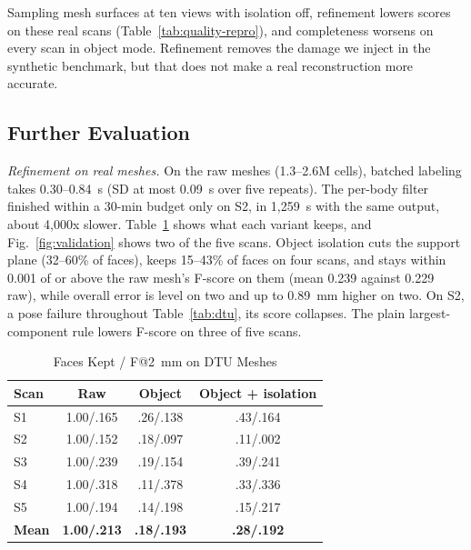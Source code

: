 \documentclass[conference]{IEEEtran}
\begin{document}
Sampling mesh surfaces at ten views with isolation off, refinement lowers scores
on these real scans (Table~\ref{tab:quality-repro}), and completeness worsens on
every scan in object mode. Refinement removes the damage we inject in the synthetic
benchmark, but that does not make a real reconstruction more accurate.

\subsection{Further Evaluation}
\label{sec:further}

\emph{Refinement on real meshes.} On the raw meshes (1.3--2.6M cells), batched
labeling takes 0.30--0.84~s (SD at most 0.09~s over five repeats). The per-body
filter finished within a 30-min budget only on S2, in 1,259~s with the same
output, about 4,000x slower. Table~\ref{tab:isolation} shows what each variant keeps, and
Fig.~\ref{fig:validation} shows two of the five scans. Object isolation
cuts the support plane (32--60\% of faces), keeps 15--43\% of faces on four scans,
and stays within 0.001 of or above the raw mesh's F-score on them (mean 0.239
against 0.229 raw), while overall error is level on two and up to 0.89~mm higher
on two. On S2, a pose failure throughout Table~\ref{tab:dtu}, its score
collapses. The plain largest-component rule lowers F-score on three of five scans.

\begin{table}[tbp]
\caption{Faces Kept / F@2~mm on DTU Meshes}
\begin{center}
\footnotesize
\setlength{\tabcolsep}{3pt}
\begin{tabular}{|l|c|c|c|}
\hline
\textbf{Scan} & \textbf{Raw} & \textbf{Object} & \textbf{Object + isolation} \\
\hline
S1 & 1.00/.165 & .26/.138 & .43/.164 \\
\hline
S2 & 1.00/.152 & .18/.097 & .11/.002 \\
\hline
S3 & 1.00/.239 & .19/.154 & .39/.241 \\
\hline
S4 & 1.00/.318 & .11/.378 & .33/.336 \\
\hline
S5 & 1.00/.194 & .14/.198 & .15/.217 \\
\hline
\textbf{Mean} & \textbf{1.00/.213} & \textbf{.18/.193} & \textbf{.28/.192} \\
\hline
\end{tabular}
\label{tab:isolation}
\end{center}
\end{table}
\end{document}

